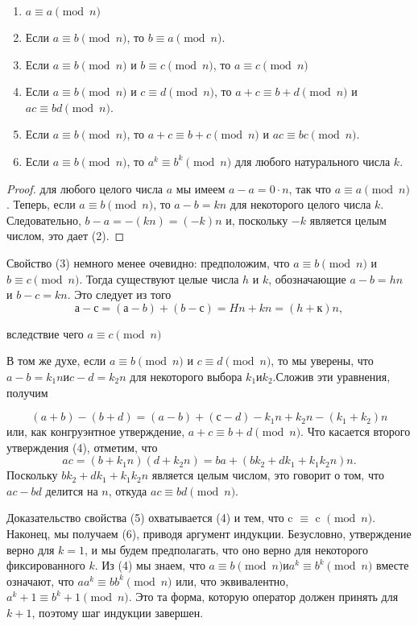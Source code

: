 \documentclass[11pt]{article}
\begin{document}
	\begin{enumerate}
		\item $a \equiv a \pmod{n}$
		\item Если $a \equiv b \pmod{n}$, то $b \equiv a \pmod{n}$.
		\item Если $a \equiv b \pmod{n}$ и $b \equiv c \pmod{n}$, то $a \equiv c \pmod{n}$
		\item Если $a \equiv b \pmod{n}$ и $c \equiv d \pmod{n}$, то $a + c \equiv b + d \pmod{n}$ и $ac \equiv bd \pmod{n}$.
		\item Если $a \equiv b \pmod{n}$, то $a + c \equiv b + c \pmod{n}$ и $ac \equiv bc \pmod{n}$.
		\item Если $a \equiv b \pmod{n}$, то $a^{k} \equiv b^{k} \pmod{n}$ для любого натурального числа $k$.
	\end{enumerate}
	\begin{proof}
		 для любого целого числа $a$ мы имеем $a-a = 0 \cdot n$, так что $a \equiv a \pmod{n}$. Теперь, если $a \equiv b \pmod{n}$, то $a-b = kn$ для некоторого целого числа $k$. Следовательно, $b-a = - (kn) = (- k) n$ и, поскольку $-k$ является целым числом, это дает (2).
	\end{proof}
	
	Свойство (3) немного менее очевидно: предположим, что $a \equiv b \pmod{n}$ и $b \equiv c \pmod{n}$. Тогда существуют целые числа $h$ и $k$, обозначающие $a-b = hn$ и $b-c = kn$. Это следует из того
	\[
		а-с = (а-b) + (b-с) = Hn + kn = (h + к) n,
	\]
	
	вследствие чего $a \equiv c \pmod{n}$
	
	В том же духе, если $a \equiv b \pmod{n}$ и $c \equiv d \pmod{n}$, то мы уверены, что $a-b = k_{1}n и c-d = k_{2}n$ для некоторого выбора $k_{1} и k_{2}. $Сложив эти уравнения, получим
	
	\[
		(a + b) - (b + d) = (a-b) + (с-d) -k_{1}n + k_{2}n- (k_{1} + k_{2}) n
	\]
	или, как конгруэнтное утверждение, $a + c  \equiv b + d \pmod{n}$. Что касается второго утверждения (4), отметим, что
	\[
		 ac = (b + k_{1} n) (d + k_{2}n) = ba + (bk_{2} + dk_{1} + k_{1}k_{2}n) n.
	\]
	Поскольку $bk_{2} + dk_{1} + k_{1}k_2n$ является целым числом, это говорит о том, что $ac-bd$ делится на $n$, откуда $ac \equiv bd \pmod{n}$.
	
	Доказательство свойства (5) охватывается (4) и тем, что c $\equiv$ c $\pmod{n}$. Наконец, мы получаем (6), приводя аргумент индукции. Безусловно, утверждение верно для $k = 1$, и мы будем предполагать, что оно верно для некоторого фиксированного $k$. Из (4) мы знаем, что $a \equiv b \pmod{n} и a^{k} \equiv b^{k} \pmod{n}$ вместе означают, что $aa^{k} \equiv bb^{k} \pmod{n}$ или, что эквивалентно, $a^{k} + 1 \equiv b^{k} + 1 \pmod{n}$. Это та форма, которую оператор должен принять для $k + 1$, поэтому шаг индукции завершен.
	
\end{document}
